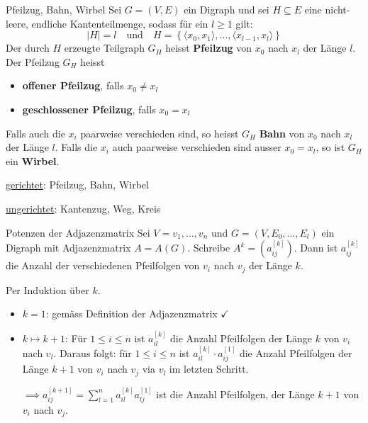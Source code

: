 \documentclass[12pt]{article}
\begin{document}
\begin{definition}{Pfeilzug, Bahn, Wirbel}{}
    Sei $G = (V, E)$ ein Digraph und sei $H \subseteq E$ eine nicht-leere, endliche Kantenteilmenge, sodass für ein $l \geq 1$ gilt: 
    $$
    |H| = l \quad \text{und} \quad H = \left\{ \langle x_0, x_1 \rangle,\dots,\langle x_{l-1}, x_l \rangle \right\}
    $$
    Der durch $H$ erzeugte Teilgraph $G_H$ heisst \textbf{Pfeilzug} von $x_0$ nach $x_l$ der Länge $l$. Der Pfeilzug $G_H$ heisst
    \begin{itemize}
        \item \textbf{offener Pfeilzug}, falls $x_0 \neq x_l$
        \item \textbf{geschlossener Pfeilzug}, falls $x_0 = x_l$
    \end{itemize}

    Falls auch die $x_i$ paarweise verschieden sind, so heisst $G_H$ \textbf{Bahn} von $x_0$ nach $x_l$ der Länge $l$. Falls die $x_i$ auch paarweise verschieden sind ausser $x_0 = x_l$, so ist $G_H$ ein \textbf{Wirbel}.
\end{definition}

\begin{remark}{}{}
    \underline{gerichtet}: Pfeilzug, Bahn, Wirbel

    \underline{ungerichtet}: Kantenzug, Weg, Kreis
\end{remark}

\begin{proposition}{Potenzen der Adjazenzmatrix}{}
    Sei $V = {v_1,\dots,v_n}$ und $G = (V, E_0,\dots,E_l)$ ein Digraph mit Adjazenzmatrix $A = A(G)$. Schreibe $A^k = (a_{ij}^{[k]})$. Dann ist $a_{ij}^{[k]}$ die Anzahl der verschiedenen Pfeilfolgen von $v_i$ nach $v_j$ der Länge $k$.
\end{proposition}

\begin{proofbox}
    Per Induktion über $k$.
    \begin{itemize}
        \item \underline{$k = 1$}: gemäss Definition der Adjazenzmatrix $\checkmark$
        \item \underline{$k \mapsto k + 1$}: Für $1 \leq i \leq n$ ist $a_{il}^{[k]}$ die Anzahl Pfeilfolgen der Länge $k$ von $v_i$ nach $v_l$. Daraus folgt: für $1 \leq i \leq n$ ist $a_{il}^{[k]} \cdot a_{ij}^{[1]}$ die Anzahl Pfeilfolgen der Länge $k + 1$ von $v_i$ nach $v_j$ via $v_l$ im letzten Schritt. 
        
        $\implies a_{ij}^{[k + 1]} = \sum_{l = 1}^n a_{il}^{[k]} a_{lj}^{[1]}$ ist die Anzahl Pfeilfolgen, der Länge $k + 1$ von $v_i$ nach $v_j$.
    \end{itemize}
\end{proofbox}
\end{document}
